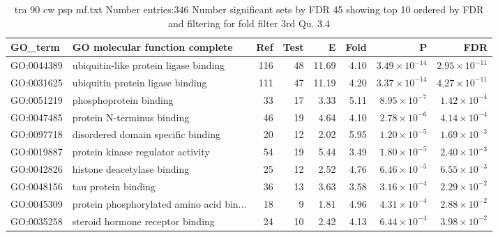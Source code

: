 \begin{table}[ht]
\centering
\begin{adjustbox}{width=\textwidth}
\begin{tabular}{llrrrrrr}
  \hline
GO\_term & GO molecular function complete & Ref & Test & E & Fold & P & FDR \\ 
  \hline
GO:0044389 & ubiquitin-like protein ligase binding  & 116 & 48 & 11.69 & 4.10 & $3.49 \times 10^{-14}$ & $2.95 \times 10^{-11}$ \\ 
  GO:0031625 & ubiquitin protein ligase binding  & 111 & 47 & 11.19 & 4.20 & $3.37 \times 10^{-14}$ & $4.27 \times 10^{-11}$ \\ 
  GO:0051219 & phosphoprotein binding  & 33 & 17 & 3.33 & 5.11 & $8.95 \times 10^{-7}$ & $1.42 \times 10^{-4}$ \\ 
  GO:0047485 & protein N-terminus binding  & 46 & 19 & 4.64 & 4.10 & $2.78 \times 10^{-6}$ & $4.14 \times 10^{-4}$ \\ 
  GO:0097718 & disordered domain specific binding  & 20 & 12 & 2.02 & 5.95 & $1.20 \times 10^{-5}$ & $1.69 \times 10^{-3}$ \\ 
  GO:0019887 & protein kinase regulator activity  & 54 & 19 & 5.44 & 3.49 & $1.80 \times 10^{-5}$ & $2.40 \times 10^{-3}$ \\ 
  GO:0042826 & histone deacetylase binding  & 25 & 12 & 2.52 & 4.76 & $6.46 \times 10^{-5}$ & $6.55 \times 10^{-3}$ \\ 
  GO:0048156 & tau protein binding  & 36 & 13 & 3.63 & 3.58 & $3.16 \times 10^{-4}$ & $2.29 \times 10^{-2}$ \\ 
  GO:0045309 & protein phosphorylated amino acid bin... & 18 & 9 & 1.81 & 4.96 & $4.31 \times 10^{-4}$ & $2.88 \times 10^{-2}$ \\ 
  GO:0035258 & steroid hormone receptor binding  & 24 & 10 & 2.42 & 4.13 & $6.44 \times 10^{-4}$ & $3.98 \times 10^{-2}$ \\ 
  \hline
\end{tabular}
\end{adjustbox}
\caption{tra 90 cw psp mf.txt Number entries:346 Number significant sets by FDR 45 showing top 10 ordered by FDR and filtering for fold filter 3rd Qu. 3.4} 
\label{tab:tra 90 cw psp mf.txt Number entries:346 Number significant sets by FDR 45 showing top 10 ordered by FDR and filtering for fold filter 3rd Qu. 3.4}
\end{table}

